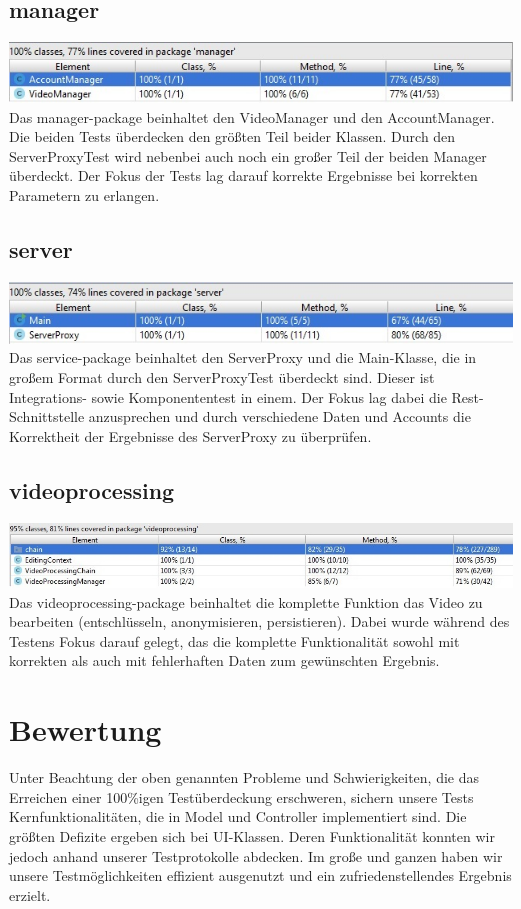 \subsection{manager}
\includegraphics[scale=0.8]{resources/manager.jpg}
Das manager-package beinhaltet den VideoManager und den AccountManager. Die beiden Tests überdecken den größten Teil beider Klassen. Durch den ServerProxyTest wird nebenbei auch noch ein großer Teil der beiden Manager überdeckt. Der Fokus der Tests lag darauf korrekte Ergebnisse bei korrekten Parametern zu erlangen.
\subsection{server}
\includegraphics[scale=0.81]{resources/server.jpg}
Das service-package beinhaltet den ServerProxy und die Main-Klasse, die in großem Format durch den ServerProxyTest überdeckt sind. Dieser ist Integrations- sowie Komponententest in einem. Der Fokus lag dabei die Rest-Schnittstelle anzusprechen und durch verschiedene Daten und Accounts die Korrektheit der Ergebnisse des ServerProxy zu überprüfen. 
\subsection{videoprocessing}
\includegraphics[scale=0.6]{resources/videoprocessing.jpg}
Das videoprocessing-package beinhaltet die komplette Funktion das Video zu bearbeiten (entschlüsseln, anonymisieren, persistieren). Dabei wurde während des Testens Fokus darauf gelegt, das die komplette Funktionalität sowohl mit korrekten als auch mit fehlerhaften Daten zum gewünschten Ergebnis. 

\section{Bewertung}
Unter Beachtung der oben genannten Probleme und Schwierigkeiten, die das Erreichen einer 100\%igen Testüberdeckung erschweren, sichern unsere Tests Kernfunktionalitäten, die in Model und Controller implementiert sind. Die größten Defizite ergeben sich bei UI-Klassen. Deren Funktionalität konnten wir jedoch anhand unserer Testprotokolle abdecken. Im große und ganzen haben wir unsere Testmöglichkeiten effizient ausgenutzt und ein zufriedenstellendes Ergebnis erzielt.